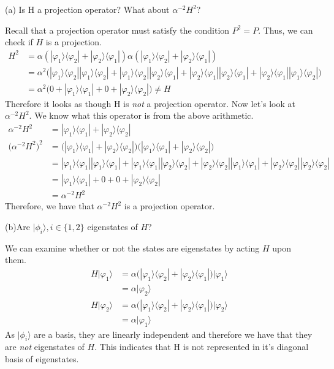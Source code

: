\documentclass[a4paper, 11pt]{article}
\newcommand{\ket}[1]{|#1\rangle}
\newcommand{\bra}[1]{\langle #1 |}
\newenvironment{solution}{%
	\begin{list}{}{%
			\setlength{\topsep}{0pt}%
			\setlength{\leftmargin}{1.5cm}%
			\setlength{\rightmargin}{1.5cm}%
			\setlength{\listparindent}{\parindent}%
			\setlength{\itemindent}{\parindent}%
			\setlength{\parsep}{\parskip}%
	}%
	\item[]}{\end{list}}
\begin{document}
\noindent(a) Is H a projection operator? What about $\alpha^{-2}H^2$? 
	\begin{solution}
		Recall that a projection operator must satisfy the condition $P^2 = P$. Thus, we can check if $H$ is a projection. 
			\begin{align*}
				H^2 &= \alpha(\ket{\varphi_1}\bra{\varphi_2}+\ket{\varphi_2}\bra{\varphi_1})\alpha(\ket{\varphi_1}\bra{\varphi_2}+\ket{\varphi_2}\bra{\varphi_1})\\ 
				&= \alpha^2\Big(\ket{\varphi_1}\bra{\varphi_2}\ket{\varphi_1}\bra{\varphi_2} + \ket{\varphi_1}\bra{\varphi_2}\ket{\varphi_2}\bra{\varphi_1}+\ket{\varphi_2}\bra{\varphi_1}\ket{\varphi_2}\bra{\varphi_1} + \ket{\varphi_2}\bra{\varphi_1}\ket{\varphi_1}\bra{\varphi_2}\Big) \\
				&= \alpha^2\Big( 0 + \ket{\varphi_1}\bra{\varphi_1}+ 0 + \ket{\varphi_2}\bra{\varphi_2}\Big) \neq H
			\end{align*}
		Therefore it looks as though H is \textit{not} a projection operator. Now let's look at $\alpha^{-2}H^2$. We know what this operator is from the above arithmetic. 
			\begin{align*}
				\alpha^{-2}H^2 &= \ket{\varphi_1}\bra{\varphi_1} + \ket{\varphi_2}\bra{\varphi_2} \\ 
				\Big(\alpha^{-2}H^2\Big)^2 &= \Big(\ket{\varphi_1}\bra{\varphi_1} + \ket{\varphi_2}\bra{\varphi_2}\Big)\Big(\ket{\varphi_1}\bra{\varphi_1} + \ket{\varphi_2}\bra{\varphi_2}\Big) \\ 
				&= \ket{\varphi_1}\bra{\varphi_1}\ket{\varphi_1}\bra{\varphi_1}+\ket{\varphi_1}\bra{\varphi_1}\ket{\varphi_2}\bra{\varphi_2}+\ket{\varphi_2}\bra{\varphi_2}\ket{\varphi_1}\bra{\varphi_1}+\ket{\varphi_2}\bra{\varphi_2}\ket{\varphi_2}\bra{\varphi_2} \\ 
				&= \ket{\varphi_1}\bra{\varphi_1}+ 0 + 0 + \ket{\varphi_2}\bra{\varphi_2} \\ 
				&= \alpha^{-2}H^2
			\end{align*}
			Therefore, we have that $\alpha^{-2}H^2$ is a projection operator. \\
	\end{solution}

\noindent(b)Are $\ket{\phi_i}, i\in\{1, 2\}$ eigenstates of $H$? 
	\begin{solution}
		\noindent We can examine whether or not the states are eigenstates by acting $H$ upon them. 	
			\begin{align*}
				H\ket{\varphi_1} &= \alpha\Big(\ket{\varphi_1}\bra{\varphi_2} + \ket{\varphi_2}\bra{\varphi_1}\Big)\ket{\varphi_1} \\ 
				&= \alpha \ket{\varphi_2}  \\ 
				H\ket{\varphi_2} &= \alpha\Big(\ket{\varphi_1}\bra{\varphi_2} + \ket{\varphi_2}\bra{\varphi_1}\Big)\ket{\varphi_2} \\ 
				&= \alpha\ket{\varphi_1}
			\end{align*}
		As $\ket{\phi_i}$ are a basis, they are linearly independent and therefore we have that they are \textit{not} eigenstates of $H$. This indicates that H is not represented in it's diagonal basis of eigenstates. \\
	\end{solution}
\end{document}
